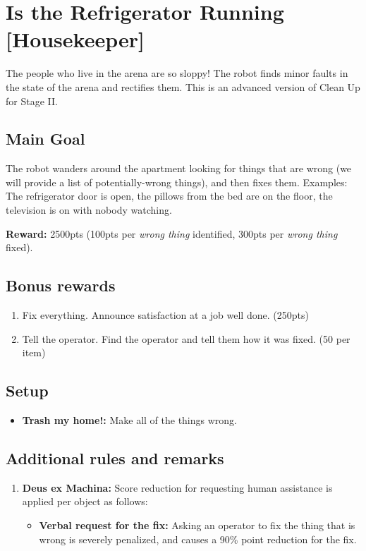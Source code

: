 \section{Is the Refrigerator Running [Housekeeper]}
The people who live in the arena are so sloppy! The robot finds minor faults in the state of the arena and rectifies them. This is an advanced version of Clean Up for Stage II.


\subsection{Main Goal}
The robot wanders around the apartment looking for things that are wrong (we will provide a list of potentially-wrong things), and then fixes them. Examples: The refrigerator door is open, the pillows from the bed are on the floor, the television is on with nobody watching.

\noindent\textbf{Reward:} 2500pts (100pts per \textit{wrong thing} identified, 300pts per \textit{wrong thing} fixed).

\subsection{Bonus rewards}
\begin{enumerate}[nosep]
	\item Fix everything. Announce satisfaction at a job well done. (250pts)
	\item Tell the operator. Find the operator and tell them how it was fixed. (50 per item)
\end{enumerate}


\subsection{Setup}
\begin{itemize}[nosep]
	\item \textbf{Trash my home!:} Make all of the things wrong.
\end{itemize}

\subsection{Additional rules and remarks}
\begin{enumerate}[nosep]
	\item \textbf{Deus ex Machina:} Score reduction for requesting human assistance is applied per object as follows:
	\begin{itemize}[nosep]
		\item \textbf{Verbal request for the fix:} Asking an operator to fix the thing that is wrong is severely penalized, and causes a 90\% point reduction for the fix.	
	\end{itemize}
\end{enumerate}

